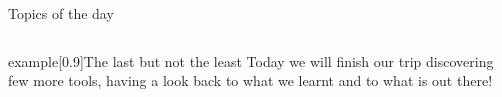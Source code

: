 
\begin{frame}
    \titlepage
\end{frame}
\begin{frame}{Topics of the day}
    \medskip
    \begin{columns}[t]
        \begin{column}{.45\textwidth}
            \hspace*{4mm}
            \begin{minipage}[t][0.45\textheight]{\textwidth}
                \tableofcontents[sections={1-3}]
            \end{minipage}
        \end{column}
        \begin{column}{.45\textwidth}
            \begin{minipage}[t][0.45\textheight]{\textwidth}
                \tableofcontents[sections={4-}]
            \end{minipage}
        \end{column}
    \end{columns}
    \vspace{6mm}
    \begin{varblock}{example}[0.9\textwidth]{The last but not the least}
        Today we will finish our trip discovering few more tools, having a look back to what we learnt and to what is out there!
    \end{varblock}
\end{frame}
